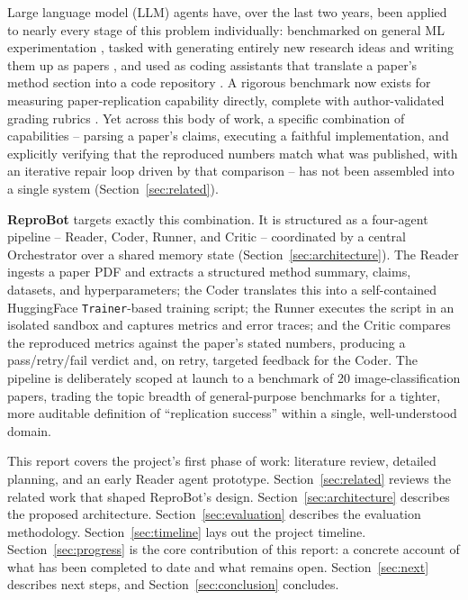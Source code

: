 \documentclass[10pt,twocolumn]{article}
\begin{document}
Large language model (LLM) agents have, over the last two years, been applied to nearly
every stage of this problem individually: benchmarked on general ML experimentation
\cite{huang2023mlagentbench}, tasked with generating entirely new research ideas and
writing them up as papers \cite{lu2024aiscientist,li2024mlrcopilot}, and used as coding
assistants that translate a paper's method section into a code repository
\cite{seo2025papercoder}. A rigorous benchmark now exists for measuring paper-replication
capability directly, complete with author-validated grading rubrics
\cite{starace2025paperbench}. Yet across this body of work, a specific combination of
capabilities -- parsing a paper's claims, executing a faithful implementation, and
explicitly verifying that the reproduced numbers match what was published, with an
iterative repair loop driven by that comparison -- has not been assembled into a single
system (Section~\ref{sec:related}).

\textbf{ReproBot} targets exactly this combination. It is structured as a four-agent
pipeline -- Reader, Coder, Runner, and Critic -- coordinated by a central Orchestrator
over a shared memory state (Section~\ref{sec:architecture}). The Reader ingests a paper
PDF and extracts a structured method summary, claims, datasets, and hyperparameters; the
Coder translates this into a self-contained HuggingFace \texttt{Trainer}-based training
script; the Runner executes the script in an isolated sandbox and captures metrics and
error traces; and the Critic compares the reproduced metrics against the paper's stated
numbers, producing a pass/retry/fail verdict and, on retry, targeted feedback for the
Coder. The pipeline is deliberately scoped at launch to a benchmark of 20
image-classification papers, trading the topic breadth of general-purpose benchmarks for
a tighter, more auditable definition of ``replication success'' within a single,
well-understood domain.

This report covers the project's first phase of work: literature review, detailed
planning, and an early Reader agent prototype. Section~\ref{sec:related} reviews the
related work that shaped ReproBot's design. Section~\ref{sec:architecture} describes the
proposed architecture. Section~\ref{sec:evaluation} describes the evaluation
methodology. Section~\ref{sec:timeline} lays out the project timeline.
Section~\ref{sec:progress} is the core contribution of this report: a concrete account
of what has been completed to date and what remains open. Section~\ref{sec:next}
describes next steps, and Section~\ref{sec:conclusion} concludes.
\end{document}
